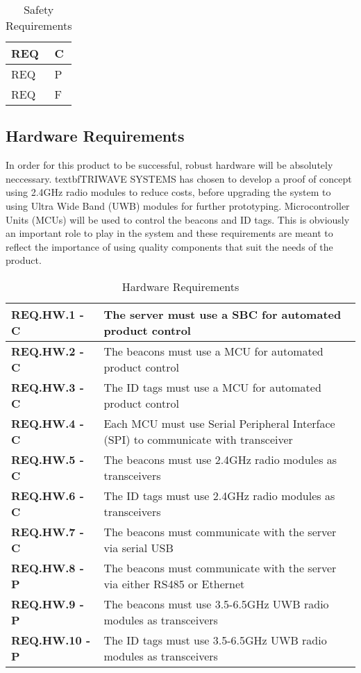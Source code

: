 \documentclass[11pt]{article}
\begin{document}
\bgroup
\def\arraystretch{1.5}
\begin{table}[H]
\centering
\begin{tabular}{ | m{3cm} | m{13cm}| } 
\hline
REQ & C\\ 
\hline
REQ & P\\ 
\hline
REQ & F\\  
\hline
\end{tabular}
\caption{Safety Requirements}
\end{table}	

\break
\subsection{Hardware Requirements}
In order for this product to be successful, robust hardware will be absolutely neccessary.  textbf{TRIWAVE SYSTEMS} has chosen to develop a proof of concept using 2.4GHz radio modules to reduce costs, before upgrading the system to using Ultra Wide Band (UWB) modules for further prototyping. Microcontroller Units (MCUs) will be used to control the beacons and ID tags. This is obviously an important role to play in the system and these requirements are meant to reflect the importance of using quality components that suit the needs of the product.
\bgroup
\def\arraystretch{1.5}
\begin{table}[H]
\centering
\begin{tabular}{ | m{3.5cm} | m{12.5cm} | } 
 \hline
 \textbf{ REQ.HW.1 - C } & The server must use a SBC for automated product control \\ 
\hline
 \textbf{ REQ.HW.2 - C } & The beacons must use a MCU for automated product control \\ 
\hline
 \textbf{ REQ.HW.3 - C } & The ID tags must use a MCU for automated product control \\ 
\hline
 \textbf{ REQ.HW.4 - C} & Each MCU must use Serial Peripheral Interface (SPI) to communicate with transceiver \\
\hline
 \textbf{ REQ.HW.5 - C } & The beacons must use 2.4GHz radio modules as transceivers \\
\hline
 \textbf{ REQ.HW.6 - C } & The ID tags must use 2.4GHz radio modules as transceivers  \\
\hline
 \textbf{ REQ.HW.7 - C } & The beacons must communicate with the server via serial  USB \\
\hline
 \textbf{ REQ.HW.8 - P } &The beacons must communicate with the server via either RS485 or Ethernet  \\
\hline
 \textbf{ REQ.HW.9 - P } & The beacons must use 3.5-6.5GHz UWB radio modules as transceivers \\
\hline
 \textbf{ REQ.HW.10 - P } & The ID tags must use 3.5-6.5GHz UWB radio modules as transceivers \\
\hline

\end{tabular}
\caption{Hardware Requirements}
\end{table}	
\end{document}
